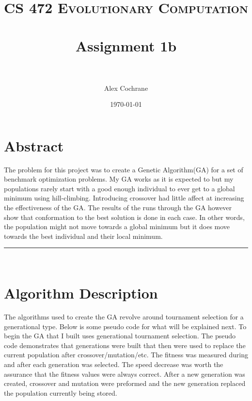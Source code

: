 \documentclass[paper=a4, fontsize=11pt]{scrartcl} %
\title{	
\normalfont \normalsize 
\textsc{CS 472 Evolutionary Computation} \\ [25pt] %
\horrule{0.5pt} \\[0.4cm] %
\huge Assignment 1b \\ %
\horrule{2pt} \\[0.5cm] %
}
\author{Alex Cochrane} %
\date{\normalsize\today} %
\numberwithin{equation}{section} %
\numberwithin{figure}{section} %
\numberwithin{table}{section} %
\newcommand{\horrule}[1]{\rule{\linewidth}{#1}} %
\begin{document}
\maketitle %


\section{Abstract}

\paragraph{} The problem for this project was to create a Genetic Algorithm(GA) for a set of benchmark optimization problems. My GA works as it is expected to but my populations rarely start with a good enough individual to ever get to a global minimum using hill-climbing. Introducing crossover had little affect at increasing the effectiveness of the GA. The results of the runs through the GA however show that conformation to the best solution is done in each case. In other words, the population might not move towards a global minimum but it does move towards the best individual and their local minimum.

\horrule{0.5pt} \\[0.4cm] %
\section{Algorithm Description}

\paragraph{} The algorithms used to create the GA revolve around tournament selection for a generational type. Below is some pseudo code for what will be explained next. To begin the GA that I built uses generational tournament selection. The pseudo code demonstrates that generations were built that then were used to replace the current population after crossover/mutation/etc. The fitness was measured during and after each generation was selected. The speed decrease was worth the assurance that the fitness values were always correct. After a new generation was created, crossover and mutation were preformed and the new generation replaced the population currently being stored.
\end{document}
